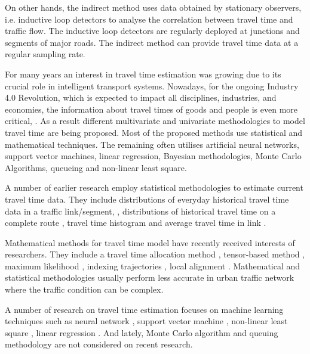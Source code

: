 \documentclass[journal]{IEEEtran}
\begin{document}
On other hands, the indirect method uses data obtained by stationary observers, i.e. inductive loop detectors \cite{Huang2008, Li2013, Dong2012, Zhang2015} to analyse the correlation between travel time and traffic flow. The inductive loop detectors are regularly deployed at junctions and segments of major roads. The indirect method can provide travel time data at a regular sampling rate.

For many years an interest in travel time estimation was growing due to its crucial role in intelligent transport systems. Nowadays, for the ongoing Industry 4.0 Revolution, which is expected to impact all disciplines, industries, and economies, the information about travel times of goods and people is even more critical, \cite{Lu2018}. As a result different multivariate and univariate methodologies to model travel time are being proposed. Most of the proposed methods use statistical and mathematical techniques. The remaining often utilises artificial neural networks, support vector machines, linear regression, Bayesian methodologies, Monte Carlo Algorithms, queueing and non-linear least square. 

A number of earlier research employ statistical methodologies to estimate current travel time data. They include distributions of everyday historical travel time data in a traffic link/segment, \cite{Kim2017,Derrmann2016,Wan2014,Jenelius2013,Rahmani2013}, distributions of historical travel time on a complete route \cite{Chitraranjan2016,Rahmani2014}, travel time histogram \cite{Waury2018,Waury2017,Lee2017} and average travel time in link \cite{Yi2015,Ahn2014,Guo2015}.

Mathematical methods for travel time model have recently received interests of researchers. They include a travel time allocation method \cite{Meng2017}, tensor-based method \cite{Tang2018}, maximum likelihood \cite{Zhao2016}, indexing trajectories \cite{Tomaras2015}, local alignment \cite{Chitraranjan2015}. Mathematical and statistical methodologies usually perform less accurate in urban traffic network where the traffic condition can be complex.

A number of research on travel time estimation focuses on machine learning techniques such as neural network \cite{Lu2018}, support vector machine \cite{Leodolter2015}, non-linear least square \cite{Zhan2013}, linear regression \cite{Leodolter2015}. And lately, Monte Carlo algorithm \cite{Hadachi2013,Hadachi2012} and queuing methodology \cite{Li2013} are not considered on recent research.
\end{document}
